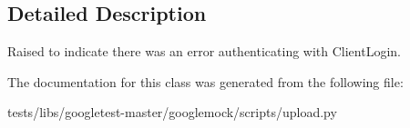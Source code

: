 \subsection{Detailed Description}
\begin{DoxyVerb}Raised to indicate there was an error authenticating with ClientLogin.\end{DoxyVerb}
 

The documentation for this class was generated from the following file\+:\begin{DoxyCompactItemize}
\item 
tests/libs/googletest-\/master/googlemock/scripts/upload.\+py\end{DoxyCompactItemize}
